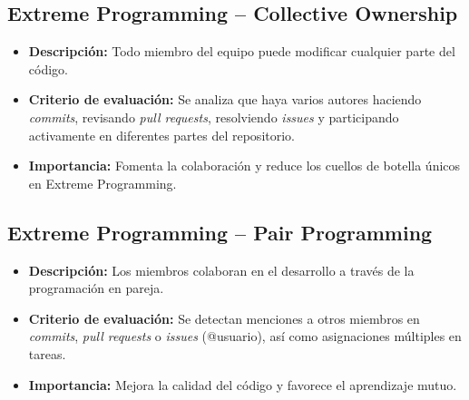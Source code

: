 \subsection{Extreme Programming – Collective Ownership}

\begin{itemize}
  \item \textbf{Descripción:} Todo miembro del equipo puede modificar cualquier parte del código.
  \item \textbf{Criterio de evaluación:} Se analiza que haya varios autores haciendo \textit{commits}, revisando \textit{pull requests}, resolviendo \textit{issues} y participando activamente en diferentes partes del repositorio.
  \item \textbf{Importancia:} Fomenta la colaboración y reduce los cuellos de botella únicos en Extreme Programming.
\end{itemize}

\subsection{Extreme Programming – Pair Programming}

\begin{itemize}
  \item \textbf{Descripción:} Los miembros colaboran en el desarrollo a través de la programación en pareja.
  \item \textbf{Criterio de evaluación:} Se detectan menciones a otros miembros en \textit{commits}, \textit{pull requests} o \textit{issues} (@usuario), así como asignaciones múltiples en tareas.
  \item \textbf{Importancia:} Mejora la calidad del código y favorece el aprendizaje mutuo.
\end{itemize}

